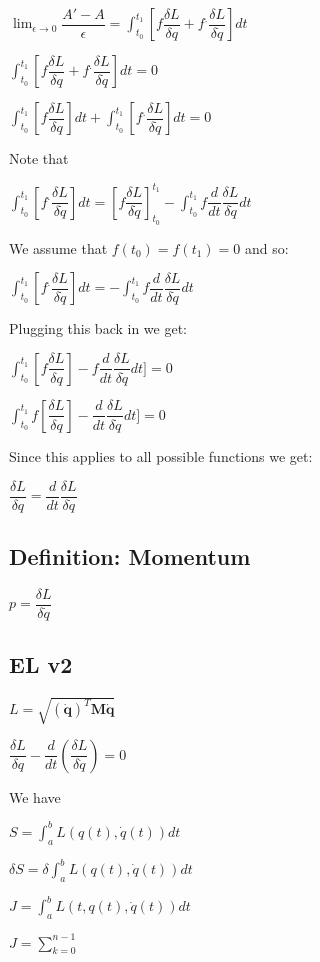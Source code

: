 \(\lim_{\epsilon \rightarrow 0} \dfrac{A'-A}{\epsilon }=\int_{t_0}^{t_1}[f\dfrac{\delta L}{\delta q}+f^.\dfrac{\delta L}{\delta \dot q}]dt\)

\(\int_{t_0}^{t_1}[f\dfrac{\delta L}{\delta q}+f^.\dfrac{\delta L}{\delta \dot q}]dt=0\)

\(\int_{t_0}^{t_1}[f\dfrac{\delta L}{\delta q}]dt +\int_{t_0}^{t_1}[f^.\dfrac{\delta L}{\delta \dot q}]dt=0\)

Note that

\(\int_{t_0}^{t_1}[f^.\dfrac{\delta L}{\delta \dot q}]dt=[f\dfrac{\delta L}{\delta \dot q}]_{t_0}^{t_1}-\int_{t_0}^{t_1}f \dfrac{d}{dt}\dfrac{\delta L}{\delta \dot q}dt\)

We assume that \(f(t_0)=f(t_1)=0\) and so:

\(\int_{t_0}^{t_1}[f^.\dfrac{\delta L}{\delta \dot q}]dt=-\int_{t_0}^{t_1}f \dfrac{d}{dt}\dfrac{\delta L}{\delta \dot q}dt\)

Plugging this back in we get:

\(\int_{t_0}^{t_1}[f\dfrac{\delta L}{\delta q}]-f \dfrac{d}{dt}\dfrac{\delta L}{\delta \dot q}dt]=0\)

\(\int_{t_0}^{t_1}f[\dfrac{\delta L}{\delta q}]-\dfrac{d}{dt}\dfrac{\delta L}{\delta \dot q}dt]=0\)

Since this applies to all possible functions we get:

\(\dfrac{\delta L}{\delta q}=\dfrac{d}{dt}\dfrac{\delta L}{\delta \dot q}\)

\subsection{Definition: Momentum}

\(p=\dfrac{\delta L}{\delta \dot q}\)

\subsection{EL v2}
\(L=\sqrt {(\mathbf {\dot q})^T\mathbf M\mathbf {\dot q}}\)

\(\dfrac{\delta L}{\delta q}- \dfrac{d}{dt}(\dfrac{\delta L}{\delta \dot q})=0\)

We have

\(S=\int_a^b L(q(t), \dot q(t))dt \)

\(\delta S=\delta \int_a^b L(q(t), \dot q(t))dt \)

\(J=\int_a^b L(t,q(t), \dot q(t)) dt\)

\(J=\sum_{k=0}^{n-1}\)


